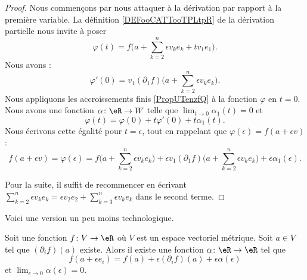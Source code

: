 \begin{proof}
	Nous commençons par nous attaquer à la dérivation par rapport à la première variable. La définition \ref{DEFooCATTooTPLtpR} de la dérivation partielle nous invite à poser
	\begin{equation}
		\varphi(t)=f\big( a+\sum_{k=2}^n\epsilon v_ke_k+tv_1e_1 \big).
	\end{equation}
	Nous avons :
	\begin{equation}
		\varphi'(0)=v_1(\partial_1f)\big( a+\sum_{k=2}^n\epsilon v_ke_k \big).
	\end{equation}
	Nous appliquons les accroissements finis \ref{PropUTenzfQ} à la fonction \( \varphi\) en \( t=0\). Nous avons une fonction \( \alpha\colon \eR\to W\) telle que \( \lim_{t\to 0} \alpha_1(t)=0\) et
	\begin{equation}
		\varphi(t)=\varphi(0)+t\varphi'(0)+t\alpha_1(t).
	\end{equation}
	Nous écrivons cette égalité pour \( t=\epsilon\), tout en rappelant que \( \varphi(\epsilon)=f(a+\epsilon v)\) :
	\begin{equation}
		f(a+\epsilon v) =  \varphi(\epsilon)=f\big( a+\sum_{k=2}^n\epsilon v_ke_k \big)+\epsilon v_1(\partial_1f)\big( a+\sum_{k=2}^n \epsilon v_ke_k \big)+\epsilon \alpha_1(\epsilon).
	\end{equation}

	Pour la suite, il suffit de recommencer en écrivant \( \sum_{k=2}^n \epsilon v_ke_k=\epsilon v_2 e_2+\sum_{k=3}^n\epsilon v_k e_k\) dans le second terme.
\end{proof}

Voici une version un peu moins technologique.
\begin{proposition}     \label{PROPooYYSMooUDxtlB}
	Soit une fonction \( f\colon V\to \eR\) où \( V\) est un espace vectoriel métrique. Soit \( a\in V\) tel que \( (\partial_if)(a)\) existe. Alors il existe une fonction \( \alpha\colon \eR\to \eR\) tel que
	\begin{equation}
		f(a+\epsilon e_i)=f(a)+\epsilon(\partial_if)(a)+\epsilon\alpha(\epsilon)
	\end{equation}
	et \( \lim_{\epsilon\to 0}\alpha(\epsilon)=0\).
\end{proposition}

